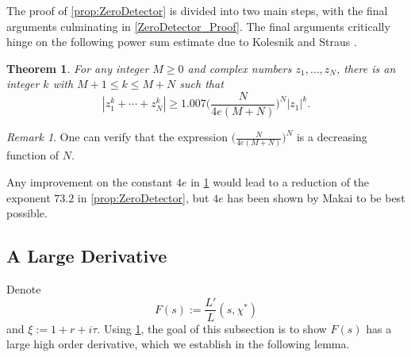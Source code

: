 \documentclass[12pt,psamsfonts]{amsart}
\newtheorem{thm}{Theorem}[section]
\theoremstyle{definition}
\theoremstyle{remark}
\numberwithin{equation}{section}
\theoremstyle{plain}
\theoremstyle{remark}
\newtheorem*{remark}{Remark}
\renewcommand{\1}{ {\bf 1}}
\begin{document}
The proof of \cref{prop:ZeroDetector} is divided into two main steps, with the final arguments culminating in \cref{ZeroDetector_Proof}.  The final arguments critically hinge on the following power sum estimate due to Kolesnik and Straus \cite{Kolesnik-Straus}. 
\begin{thm}
\label{KS-PowerSum} For any integer $M \geq 0$ and complex numbers $z_1,\dots,z_N$, there is an integer $k$ with $M+1 \leq k \leq M+N$ such that
\[
|z_1^k + \cdots + z_N^k| \geq 1.007 \Big( \frac{N}{4e(M+N)} \Big)^N |z_1|^k. 
\]
\end{thm}
\begin{remark}
	One can verify that the 	expression $\big( \frac{N}{4e(M+N)} \big)^N$ is a decreasing function of $N$. 
\end{remark}


Any improvement on the constant $4e$ in \cref{KS-PowerSum} would lead to a reduction of the exponent $73.2$ in \cref{prop:ZeroDetector}, but $4e$ has been shown by Makai \cite{Makai} to be best possible. 



\subsection{A Large Derivative}
 
 Denote
\begin{equation}
F(s) := \frac{L'}{L}(s,\chi^*)
\label{BigDerivative-F}
\end{equation}
and $\xi := 1 + r + i\tau$. Using \cref{KS-PowerSum}, the goal of this subsection is to show $F(s)$ has a large high order derivative, which we establish in the following lemma. 
 
\end{document}
